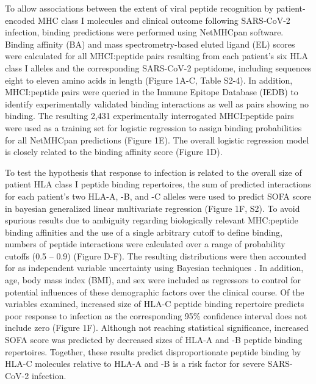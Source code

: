\documentclass[utf8]{frontiersinFPHY_FAMS} %
\begin{document}
To allow associations between the extent of viral peptide recognition by patient-encoded MHC class I molecules and clinical outcome following SARS-CoV-2 infection, binding predictions were performed using NetMHCpan software. Binding affinity (BA) and mass spectrometry-based eluted ligand (EL) scores were calculated for all MHCI:peptide pairs resulting from each patient’s six HLA class I alleles and the corresponding SARS-CoV-2 peptidome, including sequences eight to eleven amino acids in length (Figure 1A-C, Table S2-4). In addition, MHCI:peptide pairs were queried in the Immune Epitope Database (IEDB) to identify experimentally validated binding interactions as well as pairs showing no binding. The resulting 2,431 experimentally interrogated MHCI:peptide pairs were used as a training set for logistic regression to assign binding probabilities for all NetMHCpan predictions (Figure 1E). The overall logistic regression model is closely related to the binding affinity score (Figure 1D).

To test the hypothesis that response to infection is related to the overall size of patient HLA class I peptide binding repertoires, the sum of predicted interactions for each patient’s two HLA-A, -B, and -C alleles were used to predict SOFA score in bayesian generalized linear multivariate regression (Figure 1F, S2). To avoid spurious results due to ambiguity regarding biologically relevant MHC:peptide binding affinities and the use of a single arbitrary cutoff to define binding, numbers of peptide interactions were calculated over a range of probability cutoffs (0.5 – 0.9) (Figure D-F). The resulting distributions were then accounted for as independent variable uncertainty using Bayesian techniques \citep{RJ-2018-017, Carpenter2017}. In addition, age, body mass index (BMI), and sex were included as regressors to control for potential influences of these demographic factors over the clinical course. Of the variables examined, increased size of HLA-C peptide binding repertoire predicts poor response to infection as the corresponding 95\% confidence interval does not include zero (Figure 1F). Although not reaching statistical significance, increased SOFA score was predicted by decreased sizes of HLA-A and -B peptide binding repertoires. Together, these results predict disproportionate peptide binding by HLA-C molecules relative to HLA-A and -B is a risk factor for severe SARS-CoV-2 infection.
\end{document}
